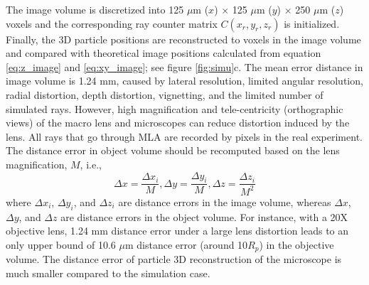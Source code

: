 \documentclass[draftthesis,fullpage]{uiucthesis}
\begin{document}
The image volume is discretized into 125 $ \mu$m ($x$) $\times$ 125 $\mu$m ($y$) $\times$ 250 $\mu$m ($z$) voxels and the corresponding ray counter matrix $C(x_r,y_r,z_r)$ is initialized. Finally, the 3D particle positions are reconstructed to voxels in the image volume and compared with theoretical image positions calculated from equation \ref{eq:z_image} and \ref{eq:xy_image}; see figure \ref{fig:simu}c. The mean error distance in image volume is 1.24 mm, caused by lateral resolution, limited angular resolution, radial distortion, depth distortion, vignetting, and the limited number of simulated rays. However, high magnification and tele-centricity (orthographic views) of the macro lens and microscopes can reduce distortion induced by the lens. All rays that go through MLA are recorded by pixels in the real experiment. The distance error in object volume should be recomputed based on the lens magnification, $M$, i.e., 
\begin{equation}
  \Delta x = \frac{\Delta x_i}{M}, \Delta y = \frac{\Delta y_i}{M}, \Delta z = \frac{\Delta z_i}{M^2}
\label{eq:error}
\end{equation}
where $\Delta x_i$, $\Delta y_i$, and $\Delta z_i$ are distance errors in the image volume, whereas $\Delta x$, $\Delta y$, and $\Delta z$ are distance errors in the object volume. For instance, with a 20X objective lens, 1.24 mm distance error under a large lens distortion leads to an only upper bound of 10.6 $\mu$m distance error (around 10$R_p$) in the objective volume. The distance error of particle 3D reconstruction of the microscope is much smaller compared to the simulation case.
\end{document}
